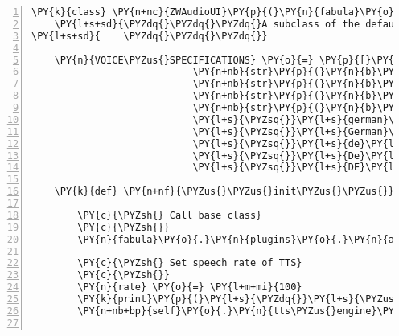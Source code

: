\begin{Verbatim}[commandchars=\\\{\},numbers=left,firstnumber=1,stepnumber=1]
\PY{k}{class} \PY{n+nc}{ZWAudioUI}\PY{p}{(}\PY{n}{fabula}\PY{o}{.}\PY{n}{plugins}\PY{o}{.}\PY{n}{audioui}\PY{o}{.}\PY{n}{AudioUserInterface}\PY{p}{)}\PY{p}{:}
    \PY{l+s+sd}{\PYZdq{}\PYZdq{}\PYZdq{}A subclass of the default AudioUserInterface to implement custom behavior.}
\PY{l+s+sd}{    \PYZdq{}\PYZdq{}\PYZdq{}}

    \PY{n}{VOICE\PYZus{}SPECIFICATIONS} \PY{o}{=} \PY{p}{[}\PY{n+nb}{str}\PY{p}{(}\PY{n}{b}\PY{l+s}{\PYZsq{}}\PY{l+s}{german}\PY{l+s}{\PYZsq{}}\PY{p}{)}\PY{p}{,}
                            \PY{n+nb}{str}\PY{p}{(}\PY{n}{b}\PY{l+s}{\PYZsq{}}\PY{l+s}{German}\PY{l+s}{\PYZsq{}}\PY{p}{)}\PY{p}{,}
                            \PY{n+nb}{str}\PY{p}{(}\PY{n}{b}\PY{l+s}{\PYZsq{}}\PY{l+s}{de}\PY{l+s}{\PYZsq{}}\PY{p}{)}\PY{p}{,}
                            \PY{n+nb}{str}\PY{p}{(}\PY{n}{b}\PY{l+s}{\PYZsq{}}\PY{l+s}{De}\PY{l+s}{\PYZsq{}}\PY{p}{)}\PY{p}{,}
                            \PY{n+nb}{str}\PY{p}{(}\PY{n}{b}\PY{l+s}{\PYZsq{}}\PY{l+s}{DE}\PY{l+s}{\PYZsq{}}\PY{p}{)}\PY{p}{,}
                            \PY{l+s}{\PYZsq{}}\PY{l+s}{german}\PY{l+s}{\PYZsq{}}\PY{p}{,}
                            \PY{l+s}{\PYZsq{}}\PY{l+s}{German}\PY{l+s}{\PYZsq{}}\PY{p}{,}
                            \PY{l+s}{\PYZsq{}}\PY{l+s}{de}\PY{l+s}{\PYZsq{}}\PY{p}{,}
                            \PY{l+s}{\PYZsq{}}\PY{l+s}{De}\PY{l+s}{\PYZsq{}}\PY{p}{,}
                            \PY{l+s}{\PYZsq{}}\PY{l+s}{DE}\PY{l+s}{\PYZsq{}}\PY{p}{]}

    \PY{k}{def} \PY{n+nf}{\PYZus{}\PYZus{}init\PYZus{}\PYZus{}}\PY{p}{(}\PY{n+nb+bp}{self}\PY{p}{,} \PY{n}{assets}\PY{p}{,} \PY{n}{framerate}\PY{p}{,} \PY{n}{host}\PY{p}{)}\PY{p}{:}

        \PY{c}{\PYZsh{} Call base class}
        \PY{c}{\PYZsh{}}
        \PY{n}{fabula}\PY{o}{.}\PY{n}{plugins}\PY{o}{.}\PY{n}{audioui}\PY{o}{.}\PY{n}{AudioUserInterface}\PY{o}{.}\PY{n}{\PYZus{}\PYZus{}init\PYZus{}\PYZus{}}\PY{p}{(}\PY{n+nb+bp}{self}\PY{p}{,} \PY{n}{assets}\PY{p}{,} \PY{n}{framerate}\PY{p}{,} \PY{n}{host}\PY{p}{)}

        \PY{c}{\PYZsh{} Set speech rate of TTS}
        \PY{c}{\PYZsh{}}
        \PY{n}{rate} \PY{o}{=} \PY{l+m+mi}{100}
        \PY{k}{print}\PY{p}{(}\PY{l+s}{\PYZdq{}}\PY{l+s}{\PYZus{}\PYZus{}init\PYZus{}\PYZus{}(): rate == \PYZob{}\PYZcb{}}\PY{l+s}{\PYZdq{}}\PY{o}{.}\PY{n}{format}\PY{p}{(}\PY{n}{rate}\PY{p}{)}\PY{p}{)}
        \PY{n+nb+bp}{self}\PY{o}{.}\PY{n}{tts\PYZus{}engine}\PY{o}{.}\PY{n}{setProperty}\PY{p}{(}\PY{l+s}{\PYZsq{}}\PY{l+s}{rate}\PY{l+s}{\PYZsq{}}\PY{p}{,} \PY{n}{rate}\PY{p}{)}


\end{Verbatim}
